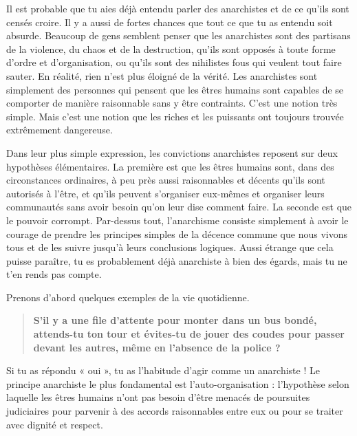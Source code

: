 
Il est probable que tu aies déjà entendu parler des anarchistes et de ce qu'ils sont censés croire. Il y a aussi de fortes chances que tout ce que tu as entendu soit absurde. Beaucoup de gens semblent penser que les anarchistes sont des partisans de la violence, du chaos et de la destruction, qu'ils sont opposés à toute forme d'ordre et d'organisation, ou qu'ils sont des nihilistes fous qui veulent tout faire sauter. En réalité, rien n'est plus éloigné de la vérité. Les anarchistes sont simplement des personnes qui pensent que les êtres humains sont capables de se comporter de manière raisonnable sans y être contraints. C'est une notion très simple. Mais c'est une notion que les riches et les puissants ont toujours trouvée extrêmement dangereuse.

Dans leur plus simple expression, les convictions anarchistes reposent sur deux hypothèses élémentaires. La première est que les êtres humains sont, dans des circonstances ordinaires, à peu près aussi raisonnables et décents qu'ils sont autorisés à l'être, et qu'ils peuvent s'organiser eux-mêmes et organiser leurs communautés sans avoir besoin qu'on leur dise comment faire. La seconde est que le pouvoir corrompt. Par-dessus tout, l'anarchisme consiste simplement à avoir le courage de prendre les principes simples de la décence commune que nous vivons tous et de les suivre jusqu'à leurs conclusions logiques. Aussi étrange que cela puisse paraître, tu es probablement déjà anarchiste à bien des égards, mais tu ne t'en rends pas compte.

Prenons d'abord quelques exemples de la vie quotidienne.

\begin{quotation}
\textbf{S'il y a une file d'attente pour monter dans un bus bondé, attends-tu ton tour et évites-tu de jouer des coudes pour passer devant les autres, même en l'absence de la police ?}
\end{quotation}

Si tu as répondu « oui », tu as l'habitude d'agir comme un anarchiste ! Le principe anarchiste le plus fondamental est l'auto-organisation : l'hypothèse selon laquelle les êtres humains n'ont pas besoin d'être menacés de poursuites judiciaires pour parvenir à des accords raisonnables entre eux ou pour se traiter avec dignité et respect.

